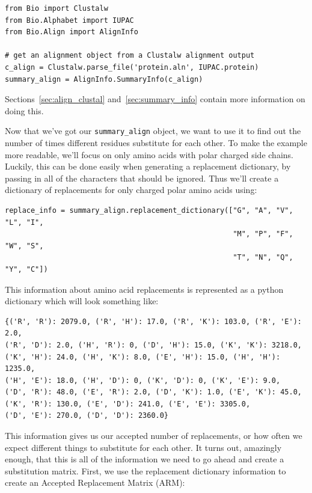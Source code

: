 \documentclass{report}
\begin{document}
\begin{verbatim}
from Bio import Clustalw
from Bio.Alphabet import IUPAC
from Bio.Align import AlignInfo

# get an alignment object from a Clustalw alignment output
c_align = Clustalw.parse_file('protein.aln', IUPAC.protein)
summary_align = AlignInfo.SummaryInfo(c_align)
\end{verbatim}

Sections~\ref{sec:align_clustal} and~\ref{sec:summary_info} contain
more information on doing this.


Now that we've got our \verb|summary_align| object, we want to use it
to find out the number of times different residues substitute for each
other. To make the example more readable, we'll focus on only amino
acids with polar charged side chains. Luckily, this can be done easily 
when generating a replacement dictionary, by passing in all of the
characters that should be ignored. Thus we'll create a dictionary of
replacements for only charged polar amino acids using:

\begin{verbatim}
replace_info = summary_align.replacement_dictionary(["G", "A", "V", "L", "I",
                                                     "M", "P", "F", "W", "S",
                                                     "T", "N", "Q", "Y", "C"])
\end{verbatim}

This information about amino acid replacements is represented as a
python dictionary which will look something like:


\begin{verbatim}
{('R', 'R'): 2079.0, ('R', 'H'): 17.0, ('R', 'K'): 103.0, ('R', 'E'): 2.0, 
('R', 'D'): 2.0, ('H', 'R'): 0, ('D', 'H'): 15.0, ('K', 'K'): 3218.0, 
('K', 'H'): 24.0, ('H', 'K'): 8.0, ('E', 'H'): 15.0, ('H', 'H'): 1235.0, 
('H', 'E'): 18.0, ('H', 'D'): 0, ('K', 'D'): 0, ('K', 'E'): 9.0, 
('D', 'R'): 48.0, ('E', 'R'): 2.0, ('D', 'K'): 1.0, ('E', 'K'): 45.0, 
('K', 'R'): 130.0, ('E', 'D'): 241.0, ('E', 'E'): 3305.0, 
('D', 'E'): 270.0, ('D', 'D'): 2360.0}
\end{verbatim}

This information gives us our accepted number of replacements, or how
often we expect different things to substitute for each other. It
turns out, amazingly enough, that this is all of the information we
need to go ahead and create a substitution matrix. First, we use the
replacement dictionary information to create an Accepted Replacement
Matrix (ARM):
\end{document}
